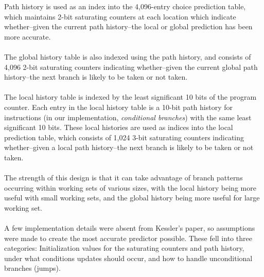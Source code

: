 \documentclass[twocolumn]{article}
\begin{document}
Path history is used as an index into the 4,096-entry choice prediction table, which maintains 2-bit saturating counters at each location which indicate whether--given the current path history--the local or global prediction has been more accurate.\\\\  
The global history table is also indexed using the path history, and consists of 4,096 2-bit saturating counters indicating whether--given the current global path history--the next branch is likely to be taken or not taken.\\\\
The local history table is indexed by the least significant 10 bits of the program counter.  Each entry in the local history table is a 10-bit path history for instructions (in our implementation, \textit{conditional branches}) with the same least significant 10 bits.  These local histories are used as indices into the local prediction table, which consists of 1,024 3-bit saturating counters indicating whether--given a local path history--the next branch is likely to be taken or not taken.\\\\
The strength of this design is that it can take advantage of branch patterns occurring within working sets of various sizes, with the local history being more useful with small working sets, and the global history being more useful for large working set.\\\\
A few implementation details were absent from Kessler's paper, so assumptions were made to create the most accurate predictor possible.  These fell into three categories:  Initialization values for the saturating counters and path history, under what conditions updates should occur, and how to handle unconditional branches (jumps).
\end{document}
